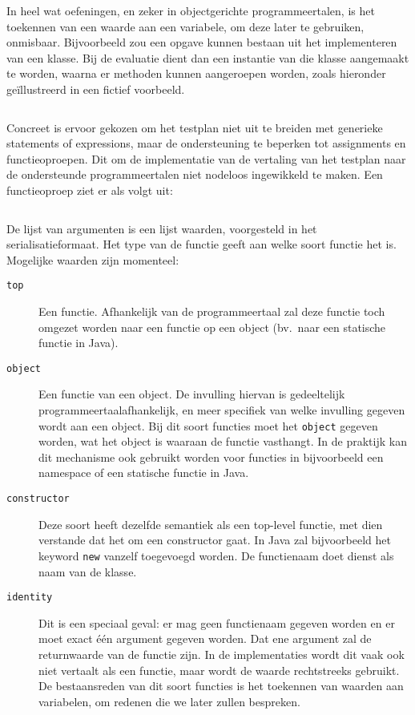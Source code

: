 In heel wat oefeningen, en zeker in objectgerichte programmeertalen, is het toekennen van een waarde aan een variabele, om deze later te gebruiken, onmisbaar.
Bijvoorbeeld zou een opgave kunnen bestaan uit het implementeren van een klasse.
Bij de evaluatie dient dan een instantie van die klasse aangemaakt te worden, waarna er methoden kunnen aangeroepen worden, zoals hieronder geïllustreerd in een fictief voorbeeld.

\inputminted{java}{code/assignment.jshell}

Concreet is ervoor gekozen om het testplan niet uit te breiden met generieke statements of expressions, maar de ondersteuning te beperken tot assignments en functieoproepen.
Dit om de implementatie van de vertaling van het testplan naar de ondersteunde programmeertalen niet nodeloos ingewikkeld te maken.
Een functieoproep ziet er als volgt uit:

\inputminted{json}{code/function.json}

De lijst van argumenten is een lijst waarden, voorgesteld in het serialisatieformaat.
Het type van de functie geeft aan welke soort functie het is.
Mogelijke waarden zijn momenteel:
\begin{description}
    \item[\texttt{top}] Een  functie.
    Afhankelijk van de programmeertaal zal deze functie toch omgezet worden naar een functie op een object (bv.\ naar een statische functie in Java).
    \item[\texttt{object}] Een functie van een object.
    De invulling hiervan is gedeeltelijk programmeertaalafhankelijk, en meer specifiek van welke invulling gegeven wordt aan een object.
    Bij dit soort functies moet het \texttt{object} gegeven worden, wat het object is waaraan de functie vasthangt.
    In de praktijk kan dit mechanisme ook gebruikt worden voor functies in bijvoorbeeld een namespace of een statische functie in Java.
    \item[\texttt{constructor}] Deze soort heeft dezelfde semantiek als een top-level functie, met dien verstande dat het om een constructor gaat.
    In Java zal bijvoorbeeld het keyword \texttt{new} vanzelf toegevoegd worden.
    De functienaam doet dienst als naam van de klasse.
    \item[\texttt{identity}] Dit is een speciaal geval: er mag geen functienaam gegeven worden en er moet exact één argument gegeven worden.
    Dat ene argument zal de returnwaarde van de functie zijn.
    In de implementaties wordt dit vaak ook niet vertaalt als een functie, maar wordt de waarde rechtstreeks gebruikt.
    De bestaansreden van dit soort functies is het toekennen van waarden aan variabelen, om redenen die we later zullen bespreken.
\end{description}

